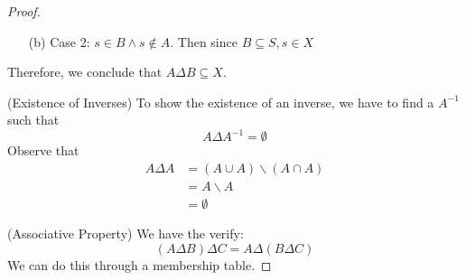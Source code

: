 \documentclass{article}
\begin{document}
\begin{enumerate}
\begin{proof}
\begin{enumerate}
				\item [(b)] Case 2: $s \in B \land s \notin A$. Then since $B \subseteq S, s \in X$
			\end{enumerate}
			Therefore, we conclude that $A\Delta B \subseteq X$.

			(Existence of Inverses) To show the existence of an inverse, we have to find a $A^{-1}$ such that 
			\begin{equation*}
				A \Delta A^{-1} = \emptyset
			\end{equation*}
			Observe that 
			\begin{align*}
				A \Delta A &= (A \cup A) \backslash (A \cap A) \\
					   &= A \backslash A \\
					   &= \emptyset
			\end{align*}

			(Associative Property) We have the verify:
			\begin{equation*}
				(A \Delta B) \Delta C = A \Delta (B \Delta C)
			\end{equation*}
			We can do this through a membership table.
		\end{proof}
\end{enumerate}
\end{document}
